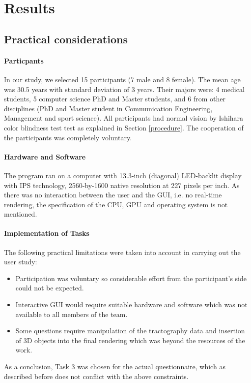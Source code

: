 \documentclass[hyperref, plainreport, noproblem]{cgvpub1}
\begin{document}
\section{Results}
\subsection{Practical considerations }
\paragraph{Particpants} In our study, we selected 15 participants (7 male and 8 female). The  mean age was 30.5 years with standard deviation of 3 years. Their majors were: 4 medical students, 5 computer science PhD and Master students, and 6 from other disciplines (PhD and Master student in Communication Engineering, Management and sport science). All participants had normal vision by Ishihara color blindness test test as explained in Section \ref{procedure}. The cooperation of the participants was completely voluntary.

\paragraph{Hardware and Software} The program ran on a computer with 13.3-inch (diagonal) LED-backlit display with IPS technology, 2560-by-1600 native resolution at 227 pixels per inch. As there was no interaction between the user and the GUI, i.e. no real-time rendering, the specification of the CPU, GPU and operating system is not mentioned. 

\paragraph{Implementation of Tasks} The following practical limitations were taken into account in carrying out the user study:
\begin{itemize}
	\item Participation was voluntary so considerable effort from the participant's side could not be expected.
	\item Interactive GUI would require suitable hardware and software which was not available to all members of the team.
	\item Some questions require manipulation of the tractography data and insertion of 3D objects into the final rendering which was beyond the resources of the work.
\end{itemize}
As a conclusion, Task 3 was chosen for the actual questionnaire, which as described before does not conflict with the above constraints.
\end{document}
